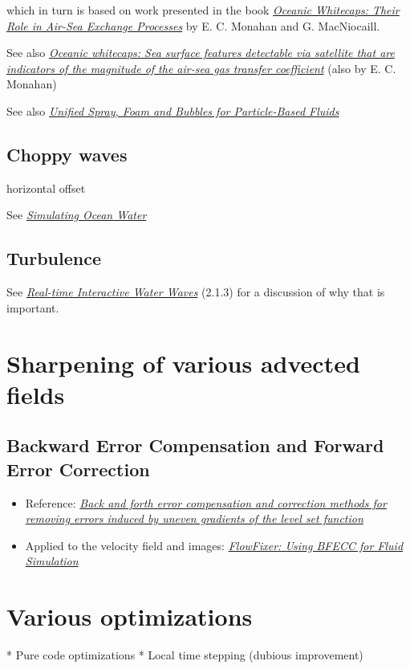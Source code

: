 which in turn is based on work presented in the book \textit{\href{http://books.google.se/books?id=xuwFz1bPTHgC}{Oceanic Whitecaps: Their Role in Air-Sea Exchange Processes}} by E. C. Monahan and G. MacNiocaill.

See also \textit{\href{http://www.ias.ac.in/jess/sep2002/Ps18.pdf}{Oceanic whitecaps: Sea surface features detectable via satellite that are indicators of the magnitude of the air-sea gas transfer coefficient}} (also by  E. C. Monahan)

See also \textit{\href{http://cg.informatik.uni-freiburg.de/publications/2012_CGI_sprayFoamBubbles.pdf}{Unified Spray, Foam and Bubbles for Particle-Based Fluids}}

\subsection{Choppy waves}

horizontal offset

See \textit{\href{http://graphics.ucsd.edu/courses/rendering/2005/jdewall/tessendorf.pdf}{Simulating Ocean Water}}

\subsection{Turbulence}

See \textit{\href{http://publications.dice.se/attachments/water\%20interaction\%20ottosson_bjorn.pdf}{Real-time Interactive Water Waves}} (2.1.3) for a discussion of why that is important.

\section{Sharpening of various advected fields}

\subsection{Backward Error Compensation and Forward Error Correction}

\begin{itemize}
    \item Reference: \textit{\href{http://smartech.gatech.edu/xmlui/bitstream/handle/1853/29473/2002-389.pdf}{Back and forth error compensation and correction methods for removing errors induced by uneven gradients of the level set function}}
    \item Applied to the velocity field and images: \textit{\href{http://www.gvu.gatech.edu/~jarek/papers/FlowFixer.pdf}{FlowFixer: Using BFECC for Fluid Simulation}}
\end{itemize}

\section{Various optimizations}

* Pure code optimizations
* Local time stepping (dubious improvement)